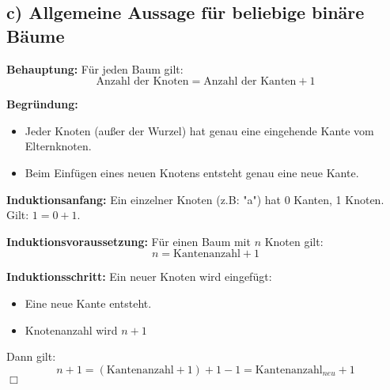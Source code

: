 \subsection*{c) Allgemeine Aussage für beliebige binäre Bäume}

\textbf{Behauptung:} Für jeden Baum gilt:
\[
\text{Anzahl der Knoten} = \text{Anzahl der Kanten} + 1
\]

\textbf{Begründung:}
\begin{itemize}
    \item Jeder Knoten (außer der Wurzel) hat genau eine eingehende Kante vom Elternknoten.
    \item Beim Einfügen eines neuen Knotens entsteht genau eine neue Kante.
\end{itemize}

\textbf{Induktionsanfang:}
Ein einzelner Knoten (z.B: "a") hat 0 Kanten, 1 Knoten. Gilt: $1 = 0 + 1$.

\textbf{Induktionsvoraussetzung:} Für einen Baum mit $n$ Knoten gilt:
\[
n = \text{Kantenanzahl} + 1
\]

\textbf{Induktionsschritt:}
Ein neuer Knoten wird eingefügt:
\begin{itemize}
    \item Eine neue Kante entsteht.
    \item Knotenanzahl wird $n+1$
\end{itemize}
Dann gilt:
\[
n + 1 = (\text{Kantenanzahl} + 1) + 1 - 1 = \text{Kantenanzahl}_{neu} + 1
\]
$\Box$


